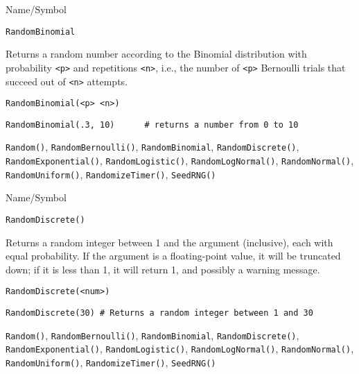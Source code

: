 \begin{desc}{Name/Symbol}
\item[Name/Symbol]	\verb+RandomBinomial+

\item[Description] Returns a random number according to the Binomial
  distribution with probability \verb+<p>+ and repetitions \verb+<n>+,
  i.e., the number of \verb+<p>+ Bernoulli trials that succeed out of
  \verb+<n>+ attempts.

\item[Usage]		
\begin{verbatim}
RandomBinomial(<p> <n>)  
\end{verbatim}

\item[Example]	
\begin{verbatim}
RandomBinomial(.3, 10)		# returns a number from 0 to 10
\end{verbatim}

\item[See Also]	\verb+Random()+, \verb+RandomBernoulli()+, \verb+RandomBinomial+,
		\verb+RandomDiscrete()+, \verb+RandomExponential()+, \verb+RandomLogistic()+,
		\verb+RandomLogNormal()+, \verb+RandomNormal()+, \verb+RandomUniform()+,    
		\verb+RandomizeTimer()+, \verb+SeedRNG()+    
\end{desc}

\rl


\begin{desc}{Name/Symbol}
\item[Name/Symbol]	\verb+RandomDiscrete()+

\item[Description]	Returns a random integer between 1 and the argument 
		(inclusive), each with equal probability.  If the argument is 
		a floating-point value, it will be truncated down; if it is 
		less than 1, it will return 1, and possibly a warning message. 

\item[Usage]		
\begin{verbatim}
RandomDiscrete(<num>)
\end{verbatim}
         
\item[Example]	
\begin{verbatim}
RandomDiscrete(30) # Returns a random integer between 1 and 30
\end{verbatim}

\item[See Also]	\verb+Random()+, \verb+RandomBernoulli()+, \verb+RandomBinomial+, 
		\verb+RandomDiscrete()+, \verb+RandomExponential()+, \verb+RandomLogistic()+,
		\verb+RandomLogNormal()+, \verb+RandomNormal()+, \verb+RandomUniform()+,
		\verb+RandomizeTimer()+, \verb+SeedRNG()+    
\end{desc}

